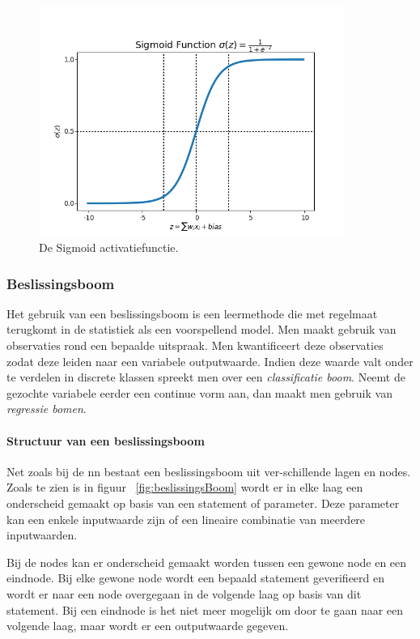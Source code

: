 			 
			
			\begin{figure}
				\centering
				\includegraphics[width=100mm]{afbeeldingen/sigmoid2.PNG}
				\caption[De Sigmoid activatiefunctie.]{De Sigmoid activatiefunctie\cite{bron:sigmoidfoto}.}
				\label{fig:sigmoid}
			\end{figure}

	\subsubsection{Beslissingsboom} 
	Het gebruik van een beslissingsboom is een leermethode die met regelmaat terugkomt in de statistiek als een voorspellend model. Men maakt gebruik van observaties rond een bepaalde uitspraak. Men kwantificeert deze observaties zodat deze leiden naar een variabele outputwaarde. Indien deze waarde valt onder te verdelen in discrete klassen spreekt men over een \textit{classificatie boom}. Neemt de gezochte variabele eerder een continue vorm aan, dan maakt men gebruik van \textit{regressie bomen}.
	

	
		\paragraph{Structuur van een beslissingsboom}			
		Net zoals bij de \gls{nn} bestaat een beslissingsboom uit ver\hyp{}schillende lagen en nodes. Zoals te zien is in figuur ~\ref{fig:beslissingsBoom} wordt er in elke laag een onderscheid gemaakt op basis van een statement of parameter. Deze parameter kan een enkele inputwaarde zijn of een lineaire combinatie van meerdere inputwaarden. 
		
		Bij de nodes kan er onderscheid gemaakt worden tussen een gewone node en een eindnode. Bij elke gewone node wordt een bepaald statement geverifieerd en wordt er naar een node overgegaan in de volgende laag op basis van dit statement. Bij een eindnode is het niet meer mogelijk om door te gaan naar een volgende laag, maar wordt er een outputwaarde gegeven.
		
